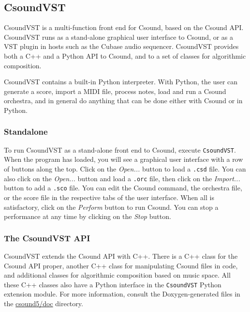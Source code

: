 \documentclass[10pt,letterpaper,onecolumn]{book}
\begin{document}
%
%

\subsection{CsoundVST}

CsoundVST is a multi-function front end for Csound, based on the Csound API. CsoundVST runs as a stand-alone graphical user interface to Csound, or as a VST plugin in hosts such as the Cubase audio sequencer. CsoundVST provides both a C++ and a Python API to Csound, and to a set of classes for algorithmic composition. 

CsoundVST contains a built-in Python interpreter. With Python, the user can generate a score, import a MIDI file, process notes, load and run a Csound orchestra, and in general do anything that can be done either with Csound or in Python.

\subsubsection{Standalone}

To run CsoundVST as a stand-alone front end to Csound, execute \texttt{CsoundVST}. When the program has loaded, you will see a graphical user interface with a row of buttons along the top. Click on the \emph{Open...} button to load a \texttt{.csd} file. You can also click on the \emph{Open...} button and load a \texttt{.orc} file, then click on the \emph{Import...} button to add a \texttt{.sco} file. You can edit the Csound command, the orchestra file, or the score file in the respective tabs of the user interface. When all is satisfactory, click on the \emph{Perform} button to run Csound. You can stop a performance at any time by clicking on the \emph{Stop} button.

\subsubsection{The CsoundVST API}

CsoundVST extends the Csound API with C++. There is a C++ class for the Csound API proper, another C++ class for manipulating Csound files in code, and additional classes for algorithmic composition based on music space. All these C++ classes also have a Python interface in the \texttt{CsoundVST} Python extension module. For more information, consult the Doxygen-generated files in the \url{csound5/doc} directory.
\end{document}
